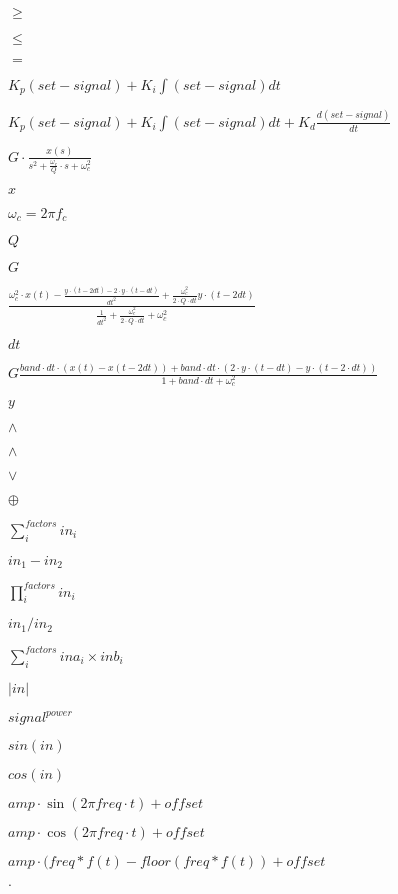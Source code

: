 \documentclass{article}
\begin{document}
$ \geq $
\pagebreak

$ \leq $
\pagebreak

$ = $
\pagebreak

$ K_p (set-signal) + K_i \int (set-signal) dt $
\pagebreak

$ K_p (set-signal) + K_i \int (set-signal) dt +K_d\frac{d(set-signal)}{dt}$
\pagebreak

$ G \cdot \frac{x(s)}{s^{2} + \frac{ \omega_{c} }{Q} \cdot s + \omega^{2}_{c} } $
\pagebreak

$ x $
\pagebreak

$ \omega_{c} = 2 \pi f_c $
\pagebreak

$ Q $
\pagebreak

$ G $
\pagebreak

$ \frac{\omega ^2 _c \cdot x(t) - \frac {y \cdot (t-2dt) - 2 \cdot y \cdot (t-dt)}{dt^2} + \frac{\omega ^2 _c}{2 \cdot Q \cdot dt} y \cdot (t-2dt) }{ \frac{1}{dt^2} + \frac{\omega ^2 _c}{2 \cdot Q \cdot dt} + \omega ^2 _c }$
\pagebreak

$ dt $
\pagebreak

$ G\frac{band \cdot dt\cdot(x(t) - x(t-2dt)) + band \cdot dt \cdot (2 \cdot y \cdot (t-dt) - y \cdot (t-2 \cdot dt)) }{ 1 + band \cdot dt + \omega ^2 _c } $
\pagebreak

$ y $
\pagebreak

$ \land $
\pagebreak

$ \land$
\pagebreak

$ \lor $
\pagebreak

$ \oplus $
\pagebreak

$ \sum_i^{factors} in_i $
\pagebreak

$ in_1 - in_2 $
\pagebreak

$ \prod_i^{factors} in_i $
\pagebreak

$ in_1 / in_2 $
\pagebreak

$ \sum_i^{factors} ina_i\times inb_i $
\pagebreak

$|in|$
\pagebreak

$ signal^{power} $
\pagebreak

$sin(in)$
\pagebreak

$cos(in)$
\pagebreak

$amp\cdot \sin(2 \pi freq\cdot t) + offset $
\pagebreak

$amp\cdot \cos(2 \pi freq\cdot t) + offset $
\pagebreak

$amp\cdot( freq*f(t) - floor(freq*f(t) ) + offset $
\pagebreak

$ \cdot $
\pagebreak
\end{document}
